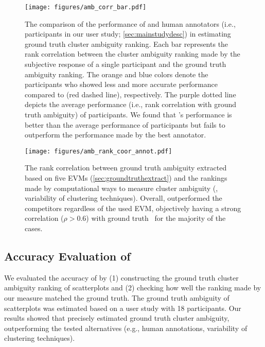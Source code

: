 \begin{figure*}
    \centering
    \texttt{[image: figures/amb\_corr\_bar.pdf]}
    \vspace{-5mm}
    \caption{The comparison of the performance of \measure and human annotators (i.e., participants in our user study; \autoref{sec:mainstudydesc}) in estimating ground truth cluster ambiguity ranking.
             Each bar represents the rank correlation between the cluster ambiguity ranking made by the subjective response of a single participant and the ground truth ambiguity ranking.
             The orange and blue colors denote the participants who showed less and more accurate performance compared to \measure (red dashed line), respectively. 
             The purple dotted line depicts the average performance (i.e., rank correlation with ground truth ambiguity) of participants. 
             We found that \measure's performance is better than the average performance of participants but fails to outperform the performance made by the best annotator.\vspace{-4mm}
             }
    \label{fig:ambcoorbar}
\end{figure*}


\begin{figure}
    \centering
    \texttt{[image: figures/amb\_rank\_coor\_annot.pdf]}
    \caption{The rank correlation between ground truth ambiguity extracted based on five EVMs (\autoref{sec:groundtruthextract}) and the rankings made by computational ways to measure cluster ambiguity (\measure, variability of clustering techniques). Overall, \measure outperformed the competitors regardless of the used EVM, objectively having a strong correlation ($\rho > 0.6$) with ground truth~\cite{prion14csn} for the majority of the cases.  }
    \label{fig:ambrankcoor}
\end{figure}




\subsection{Accuracy Evaluation of \measure}

\label{sec:mainstudy}


% 
We evaluated the accuracy of \measure by (1) constructing the ground truth cluster ambiguity ranking of scatterplots and (2) checking how well the ranking made by our measure matched the ground truth. 
The ground truth ambiguity of scatterplots was estimated based on a user study with 18 participants. 
Our results showed that \measure precisely estimated ground truth cluster ambiguity, outperforming the tested alternatives (e.g., human annotations, variability of clustering techniques).

